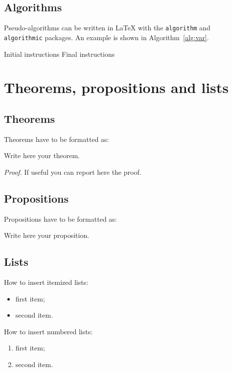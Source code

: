 \documentclass{Configuration_Files/PoliMi3i_thesis}
\begin{document}
\subsection{Algorithms}
\label{subsec:algorithms}

Pseudo-algorithms can be written in \LaTeX{} with the \texttt{algorithm} and \texttt{algorithmic} packages.
An example is shown in Algorithm~\ref{alg:var}.
\begin{algorithm}[H]
	\label{alg:example}
	\caption{Name of the Algorithm}
	\label{alg:var}
	\label{protocol1}
	\begin{algorithmic}[1]
		\STATE Initial instructions
		\ENDIF
		\ENDFOR
		\ENDWHILE
		\STATE Final instructions
	\end{algorithmic}
\end{algorithm}

\vspace{5mm}

\section{Theorems, propositions and lists}

\subsection{Theorems}
Theorems have to be formatted as:
\begin{theorem}
	\label{a_theorem}
	Write here your theorem.
\end{theorem}
\textit{Proof.} If useful you can report here the proof.

\subsection{Propositions}
Propositions have to be formatted as:
\begin{proposition}
	Write here your proposition.
\end{proposition}

\subsection{Lists}
How to  insert itemized lists:
\begin{itemize}
	\item first item;
	\item second item.
\end{itemize}
How to insert numbered lists:
\begin{enumerate}
	\item first item;
	\item second item.
\end{enumerate}
\end{document}
